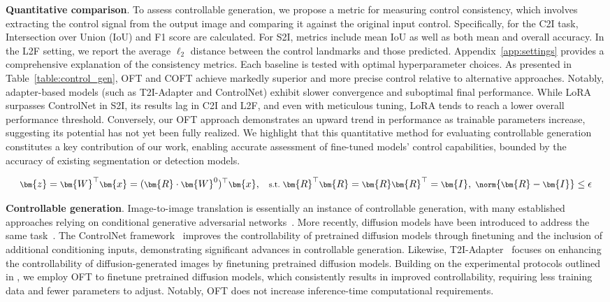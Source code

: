 \textbf{Quantitative comparison}. To assess controllable generation, we propose a metric for measuring control consistency, which involves extracting the control signal from the output image and comparing it against the original input control. Specifically, for the C2I task, Intersection over Union (IoU) and F1 score are calculated. For S2I, metrics include mean IoU as well as both mean and overall accuracy. In the L2F setting, we report the average $\ell_2$ distance between the control landmarks and those predicted. Appendix~\ref{app:settings} provides a comprehensive explanation of the consistency metrics. Each baseline is tested with optimal hyperparameter choices. As presented in Table~\ref{table:control_gen}, OFT and COFT achieve markedly superior and more precise control relative to alternative approaches. Notably, adapter-based models (such as T2I-Adapter and ControlNet) exhibit slower convergence and suboptimal final performance. While LoRA surpasses ControlNet in S2I, its results lag in C2I and L2F, and even with meticulous tuning, LoRA tends to reach a lower overall performance threshold. Conversely, our OFT approach demonstrates an upward trend in performance as trainable parameters increase, suggesting its potential has not yet been fully realized. We highlight that this quantitative method for evaluating controllable generation constitutes a key contribution of our work, enabling accurate assessment of fine-tuned models’ control capabilities, bounded by the accuracy of existing segmentation or detection models.

\begin{equation}\label{eq:coft_general}
    \footnotesize
    \bm{z}=\bm{W}^\top\bm{x}=(\bm{R}\cdot\bm{W}^0)^\top\bm{x},~~~\text{s.t.}~\bm{R}^\top\bm{R}=\bm{R}\bm{R}^\top=\bm{I},~\norm{\bm{R}-\bm{I}}\leq \epsilon
\end{equation}

\textbf{Controllable generation}. Image-to-image translation is essentially an instance of controllable generation, with many established approaches relying on conditional generative adversarial networks~\cite{isola2017image,zhu2017toward,wang2018high,park2019semantic,choi2018stargan}. More recently, diffusion models have been introduced to address the same task~\cite{saharia2022palette,voynov2022sketch,wang2022pretraining}. The ControlNet framework~\cite{zhang2023adding} improves the controllability of pretrained diffusion models through finetuning and the inclusion of additional conditioning inputs, demonstrating significant advances in controllable generation. Likewise, T2I-Adapter~\cite{mou2023t2i} focuses on enhancing the controllability of diffusion-generated images by finetuning pretrained diffusion models. Building on the experimental protocols outlined in \cite{zhang2023adding,mou2023t2i}, we employ OFT to finetune pretrained diffusion models, which consistently results in improved controllability, requiring less training data and fewer parameters to adjust. Notably, OFT does not increase inference-time computational requirements.

